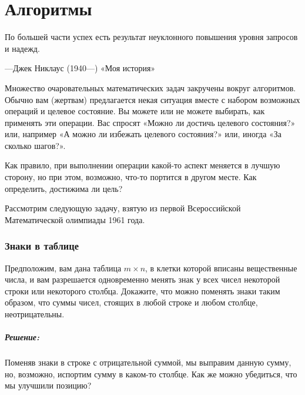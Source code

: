 ﻿\chapter*{Алгоритмы}



\setlength{\epigraphwidth}{.7\textwidth}
\epigraph{По большей части успех есть результат неуклонного повышения уровня запросов и надежд.}{---Джек Никлаус (1940---) «Моя история»}

Множество очаровательных математических задач закручены вокруг алгоритмов.
Обычно вам (жертвам) предлагается некая ситуация вместе с набором возможных операций и целевое состояние.
Вы можете или не можете выбирать, как применять эти операции.
Вас спросят «Можно ли достичь целевого состояния?» или, например «А можно ли избежать целевого состояния?» или, иногда «За сколько шагов?».

Как правило, при выполнении операции какой-то аспект меняется в лучшую сторону, но при этом, возможно, что-то портится в другом месте.
Как определить, достижима ли цель?

Рассмотрим следующую задачу, взятую из первой Всероссийской Математической олимпиады 1961 года.

\subsection*{Знаки в таблице}%

Предположим, вам дана таблица $m\times n$, в клетки которой вписаны вещественные числа, и вам разрешается одновременно менять знак у всех чисел некоторой строки или некоторого столбца.
Докажите, что можно поменять знаки таким образом, что суммы чисел, стоящих в любой строке и любом столбце, неотрицательны.

\paragraph{Решение:}
Поменяв знаки в строке с отрицательной суммой, мы выправим данную сумму, но, возможно, испортим сумму в каком-то столбце.
Как же можно убедиться, что мы улучшили позицию?

